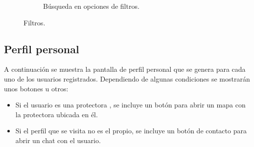\documentclass[a4paper, 12pt]{article}
\begin{document}
\begin{figure}[H]
\begin{subfigure}{0.48\textwidth}
\begin{center}
			\caption{Búsqueda en opciones de filtros.}
		\end{center}  
	\end{subfigure}\hfill
	\caption{Filtros.}
\end{figure}

\newpage
\subsection*{Perfil personal}

A continuación se muestra la pantalla de perfil personal que se genera para cada uno de los usuarios registrados. Dependiendo de algunas condiciones se mostrarán unos botones u otros:
\begin{itemize}
	\item Si el usuario es una protectora , se incluye un botón para abrir un mapa con la protectora ubicada en él.
	\item Si el perfil que se visita no es el propio, se incluye un botón de contacto para abrir un chat con el usuario.
\end{itemize}
\end{document}
